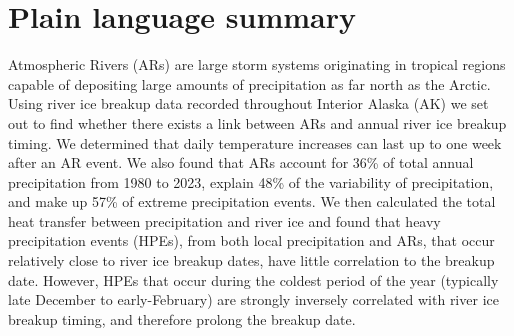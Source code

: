 \documentclass[12pts,draft]{AR_analysis_}
\begin{document}

\section*{Plain language summary}

	Atmospheric Rivers (ARs) are large storm systems originating in
	tropical regions capable of depositing large amounts of
	precipitation as far north as the Arctic. 
	Using river ice breakup data recorded throughout Interior
	Alaska (AK) we set out to find whether there exists a link between
	ARs and annual river ice breakup timing. We determined that 
	daily temperature increases can last  up to
	one week after an AR event. We also found that ARs
	account for 36\% of total annual precipitation from 1980 to 2023, 
	explain 48\% of the variability of precipitation, and make up 57\% 
	of extreme precipitation events. We then
	calculated the total heat transfer between precipitation and river
	ice and found that heavy precipitation events (HPEs),
	from both local precipitation and ARs, that occur relatively close to
	river ice breakup dates, have little correlation to the breakup
	date. However, HPEs that occur during the coldest period of the
	year (typically late December to early-February) are strongly inversely
	correlated with river ice breakup timing, and therefore prolong
	the breakup date.

%
%

%

\end{document}
